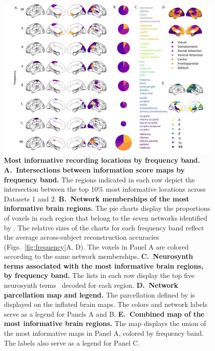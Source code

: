 \documentclass[11pt]{article}
\begin{document}
\begin{figure}
  \centering \includegraphics[width=\textwidth]{figs/networks}
  \caption{\textbf{Most informative recording locations by frequency band.}
  \textbf{A.~Intersections between information score maps by frequency band.}
  The regions indicated in each row depict the intersection between the top 10\%
  most informative locations across Datasets 1 and 2.  \textbf{B.~Network
  memberships of the most informative brain regions.}  The pie charts display
  the proportions of voxels in each region that belong to the seven networks
  identified by \cite{YeoEtal11}.  The relative sizes of the charts for each
  frequency band reflect the average across-subject reconstruction accuracies
  (Figs.~\ref{fig:frequency}A, D).  The voxels in Panel A are colored according to
  the same network memberships.  \textbf{C.~Neurosynth terms associated with the
  most informative brain regions, by frequency band.}  The lists in each row
  display the top five neurosynth terms~\citep{RubiEtal17} decoded for each
  region.  \textbf{D.~Network parcellation map and legend.}  The parcellation
  defined by \cite{YeoEtal11} is displayed on the inflated brain maps.  The
  colors and network labels serve as a legend for Panels A and B.
  \textbf{E.~Combined map of the most informative brain regions.}  The map
  displays the union of the most informative maps in Panel A, colored by
  frequency band.  The labels also serve as a legend for Panel C.}
  \label{fig:networks}
\end{figure}
\end{document}
